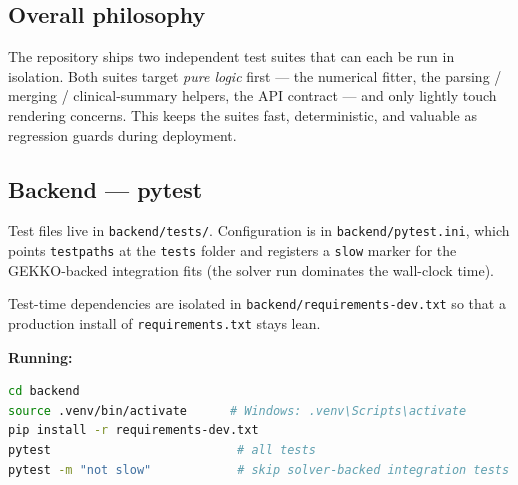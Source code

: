 \documentclass[11pt,a4paper]{article}
\begin{document}
\subsection{Overall philosophy}
The repository ships two independent test suites that can each be run in
isolation. Both suites target \emph{pure logic} first --- the numerical
fitter, the parsing / merging / clinical-summary helpers, the API contract
--- and only lightly touch rendering concerns. This keeps the suites fast,
deterministic, and valuable as regression guards during deployment.

\subsection{Backend --- pytest}
\label{subsec:backend_tests}

Test files live in \texttt{backend/tests/}. Configuration is in
\texttt{backend/pytest.ini}, which points \texttt{testpaths} at the
\texttt{tests} folder and registers a \texttt{slow} marker for the GEKKO-backed
integration fits (the solver run dominates the wall-clock time).

Test-time dependencies are isolated in \texttt{backend/requirements-dev.txt}
so that a production install of \texttt{requirements.txt} stays lean.

\textbf{Running:}
\begin{lstlisting}[language=bash]
cd backend
source .venv/bin/activate      # Windows: .venv\Scripts\activate
pip install -r requirements-dev.txt
pytest                          # all tests
pytest -m "not slow"            # skip solver-backed integration tests
\end{lstlisting}
\end{document}
